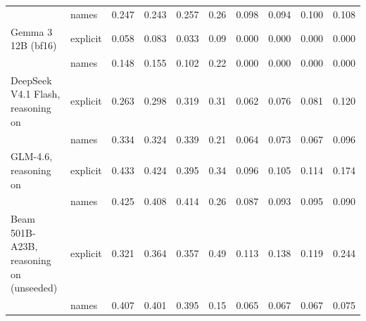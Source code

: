 \begin{tabular}{llrrrrrrrr}
 & names & 0.247 & 0.243 & 0.257 & 0.26 & 0.098 & 0.094 & 0.100 & 0.108 \\
Gemma 3 12B (bf16) & explicit & 0.058 & 0.083 & 0.033 & 0.09 & 0.000 & 0.000 & 0.000 & 0.000 \\
 & names & 0.148 & 0.155 & 0.102 & 0.22 & 0.000 & 0.000 & 0.000 & 0.000 \\
DeepSeek V4.1 Flash, reasoning on & explicit & 0.263 & 0.298 & 0.319 & 0.31 & 0.062 & 0.076 & 0.081 & 0.120 \\
 & names & 0.334 & 0.324 & 0.339 & 0.21 & 0.064 & 0.073 & 0.067 & 0.096 \\
GLM-4.6, reasoning on & explicit & 0.433 & 0.424 & 0.395 & 0.34 & 0.096 & 0.105 & 0.114 & 0.174 \\
 & names & 0.425 & 0.408 & 0.414 & 0.26 & 0.087 & 0.093 & 0.095 & 0.090 \\
Beam 501B-A23B, reasoning on (unseeded) & explicit & 0.321 & 0.364 & 0.357 & 0.49 & 0.113 & 0.138 & 0.119 & 0.244 \\
 & names & 0.407 & 0.401 & 0.395 & 0.15 & 0.065 & 0.067 & 0.067 & 0.075 \\
\bottomrule
\end{tabular}

